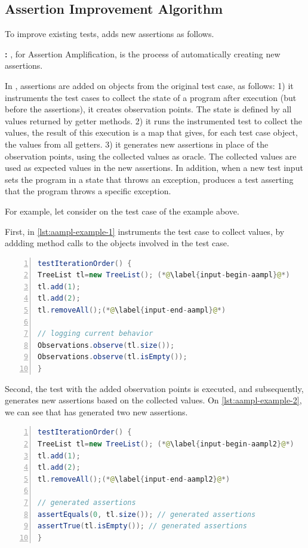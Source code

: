 \subsection{Assertion Improvement Algorithm}
\label{subsec:new-assertions}

To improve existing tests, \dspot adds new assertions as follows.

\textbf{\Aampl:} \Aampl, for Assertion Amplification, is the process of automatically creating new assertions.

In \dspot, assertions are added on objects from the original test case, as follows: 
1) it instruments the  test cases to collect the state of a program after execution (but before the assertions), \ie it creates observation points. The state is defined by all values returned by getter methods.
2) it runs the instrumented test to collect the values,
the result of this execution is a map that gives, for each test case object, the values from all getters.
3) it generates new assertions in place of the observation points, using the collected values as oracle. The collected values are used as expected values in the new assertions.
In addition, when a new test input sets the program in a state that throws an exception,  \dspot produces a test asserting that the program throws a specific exception.

For example, let consider \Aampl{} on the test case of the example above. 

First, in \autoref{lst:aampl-example-1} \dspot instruments the test case to collect values, by addding method calls to the objects involved in the test case.

\begin{lstlisting}[caption={In \Aampl{}, the second step is to instrument and run the test to collect runtime values.},label=lst:aampl-example-1,float,language=java,numbers=left] 
testIterationOrder() {
TreeList tl=new TreeList(); (*@\label{input-begin-aampl}@*)
tl.add(1);
tl.add(2);
tl.removeAll();(*@\label{input-end-aampl}@*)

// logging current behavior
Observations.observe(tl.size()); 
Observations.observe(tl.isEmpty()); 
}
\end{lstlisting}

Second, the test with the added observation points is executed, and subsequently, \dspot{} generates new assertions based on the collected values. On \autoref{lst:aampl-example-2}, we can see that \dspot has generated two new assertions.

\begin{lstlisting}[caption={In \Aampl{}, the last step is to generate the assertions based on the collected values.},label=lst:aampl-example-2,float,language=java,numbers=left] 
testIterationOrder() {
TreeList tl=new TreeList(); (*@\label{input-begin-aampl2}@*)
tl.add(1);
tl.add(2);
tl.removeAll();(*@\label{input-end-aampl2}@*)

// generated assertions
assertEquals(0, tl.size()); // generated assertions
assertTrue(tl.isEmpty()); // generated assertions
}
\end{lstlisting}

